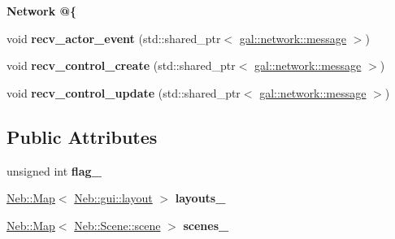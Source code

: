 \begin{Indent}{\bf \-Network @\{}
\begin{DoxyCompactItemize}
\item 
\hypertarget{classNeb_1_1app_ab7ca6fa6c02a538c380f1c1bf9c49fc8}{void {\bfseries recv\-\_\-actor\-\_\-event} (std\-::shared\-\_\-ptr$<$ \hyperlink{classgal_1_1network_1_1message}{gal\-::network\-::message} $>$)}\label{classNeb_1_1app_ab7ca6fa6c02a538c380f1c1bf9c49fc8}

\item 
\hypertarget{classNeb_1_1app_af9dfb6e16d0a0a2b1aea893c23110db1}{void {\bfseries recv\-\_\-control\-\_\-create} (std\-::shared\-\_\-ptr$<$ \hyperlink{classgal_1_1network_1_1message}{gal\-::network\-::message} $>$)}\label{classNeb_1_1app_af9dfb6e16d0a0a2b1aea893c23110db1}

\item 
\hypertarget{classNeb_1_1app_af78185f60b42955a1ac44e2dd3b16246}{void {\bfseries recv\-\_\-control\-\_\-update} (std\-::shared\-\_\-ptr$<$ \hyperlink{classgal_1_1network_1_1message}{gal\-::network\-::message} $>$)}\label{classNeb_1_1app_af78185f60b42955a1ac44e2dd3b16246}

\end{DoxyCompactItemize}
\end{Indent}
\subsection*{\-Public \-Attributes}
\begin{DoxyCompactItemize}
\item 
\hypertarget{classNeb_1_1app_aa783110fd25666e9f15e8c9acb76192e}{unsigned int {\bfseries flag\-\_\-}}\label{classNeb_1_1app_aa783110fd25666e9f15e8c9acb76192e}

\item 
\hypertarget{classNeb_1_1app_abfe758c67e44f77f245a72dd15904f62}{\hyperlink{classNeb_1_1Map}{\-Neb\-::\-Map}$<$ \hyperlink{classNeb_1_1gui_1_1layout}{\-Neb\-::gui\-::layout} $>$ {\bfseries layouts\-\_\-}}\label{classNeb_1_1app_abfe758c67e44f77f245a72dd15904f62}

\item 
\hypertarget{classNeb_1_1app_a7defdddd97e1452710df87885cd48976}{\hyperlink{classNeb_1_1Map}{\-Neb\-::\-Map}$<$ \hyperlink{classNeb_1_1Scene_1_1scene}{\-Neb\-::\-Scene\-::scene} $>$ {\bfseries scenes\-\_\-}}\label{classNeb_1_1app_a7defdddd97e1452710df87885cd48976}

\end{DoxyCompactItemize}
